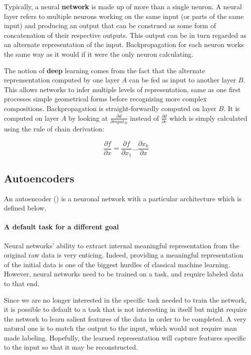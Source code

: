 \documentclass[conference]{IEEEtran}
\begin{document}
Typically, a neural \textbf{network} is made up of more than a single neuron. A
neural layer refers to multiple neurons working on the same input (or parts of
the same input) and producing an output that can be construed as some form of
concatenation of their respective outputs. This output can be in turn regarded
as an alternate representation of the input. Backpropagation for each neuron
works the same way as it would if it were the only neuron calculating.

The notion of \textbf{deep} learning comes from the fact that the alternate
reprensentation computed by one layer $A$ can be fed as input to another layer $B$.
This allows networks to infer multiple levels of representation, same as one
first processes simple geometrical forms before recognizing more complex
compositions. Backpropagation is straight-forwardly computed on layer $B$. It is
computed on layer $A$ by looking at $\frac{\partial d}{\partial input_B}$
instead of $\frac{\partial d}{\partial e}$ which is simply calculated using the
rule of chain derivation:

\begin{equation}
  \frac{\partial f}{\partial x}=\frac{\partial f}{\partial x_1}...\frac{\partial x_k}{\partial x}
\end{equation}

\subsection{Autoencoders}

An autoencoder (\cite{Hinton504}) is a neuronal network with a particular
architecture which is defined below.

\paragraph{A default task for a different goal}

Neural networks' ability to extract internal meaningful representation from the
original raw data is very enticing. Indeed, providing a meaningful
representation of the initial data is one of the biggest hurdles of classical
machine learning. However, neural networks need to be trained on a task, and
require labeled data to that end. 

Since we are no longer interested in the specific task needed to train the
network, it is possible to default to a task that is not interesting in itself
but might require the network to learn salient features of the data in order to
be completed. A very natural one is to match the output to the input, which
would not require man made labeling. Hopefully, the learned representation will
capture features specific to the input so that it may be reconstructed.
\end{document}
